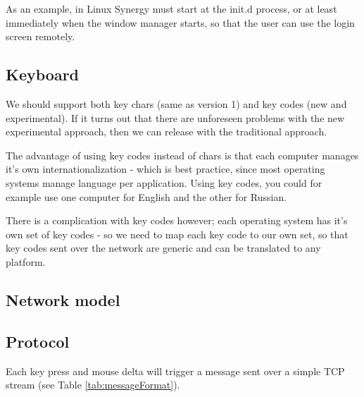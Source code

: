 As an example, in Linux Synergy 
must start at the init.d process, or at least immediately when the window 
manager starts, so that the user can use the login screen remotely.

\subsection{Keyboard}

We should support both key chars (same as version 1) and key codes (new and
experimental). If it turns out that there are unforeseen problems with the
new experimental approach, then we can release with the traditional approach.

The advantage of using key codes instead of chars is that each computer manages
it's own internationalization - which is best practice, since most operating
systems manage language per application. Using key codes, you could for example 
use one computer for English and the other for Russian.

There is a complication with key codes however; each operating system has it's
own set of key codes - so we need to map each key code to our own set, so that
key codes sent over the network are generic and can be translated to any 
platform.

\subsection{Network model}




\subsection{Protocol}




Each key press and mouse delta will trigger a message sent over a simple TCP 
stream (see Table \ref{tab:messageFormat}).

